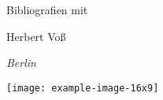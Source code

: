 \documentclass[paper=b5]{scrbook}
\begin{document}
\begin{titlepage}
	\setlength{\parindent}{0pt}
	\vspace*{1cm}
{
\centering 
{\fontsize{26pt}{30pt}\selectfont Bibliografien mit \par
{}\par
}
\vspace{.2\textheight}
{\Large Herbert Voß\par}
{\small\itshape Berlin\par}
}
\vfill
\Large\dantelogo\hfill\texttt{[image: example-image-16x9]}
\end{titlepage}
\end{document}
